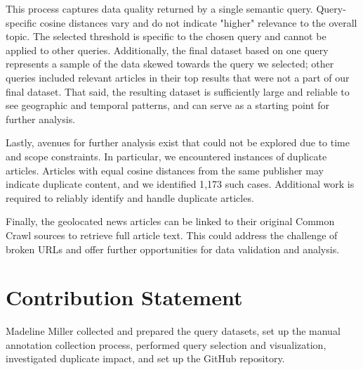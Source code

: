 \documentclass{article}
\begin{document}
This process captures data quality returned by a single semantic query. Query-specific cosine distances vary and do not indicate "higher" relevance to the overall topic. The selected threshold is specific to the chosen query and cannot be applied to other queries. Additionally, the final dataset based on one query represents a sample of the data skewed towards the query we selected; other queries included relevant articles in their top results that were not a part of our final dataset. That said, the resulting dataset is sufficiently large and reliable to see geographic and temporal patterns, and can serve as a starting point for further analysis.

Lastly, avenues for further analysis exist that could not be explored due to time and scope constraints. In particular, we encountered instances of duplicate articles. Articles with equal cosine distances from the same publisher may indicate duplicate content, and we identified 1{,}173 such cases. Additional work is required to reliably identify and handle duplicate articles.

Finally, the geolocated news articles can be linked to their original Common Crawl sources to retrieve full article text. This could address the challenge of broken URLs and offer further opportunities for data validation and analysis.



\newpage

\section*{Contribution Statement}

Madeline Miller collected and prepared the query datasets, set up the manual annotation collection process, performed query selection and visualization, investigated duplicate impact, and set up the GitHub repository.
\end{document}
